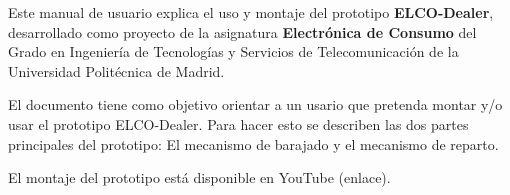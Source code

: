 Este manual de usuario explica el uso y montaje del prototipo \textbf{ELCO-Dealer}, desarrollado como proyecto de la asignatura \textbf{Electrónica de Consumo} del Grado en Ingeniería de Tecnologías y Servicios de Telecomunicación de la Universidad Politécnica de Madrid.

El documento tiene como objetivo orientar a un usario que pretenda montar   y/o usar el prototipo {ELCO-Dealer}. Para hacer esto se describen las dos partes principales del prototipo: El mecanismo de barajado y el mecanismo de reparto. 

El montaje del prototipo está disponible en YouTube (enlace).

